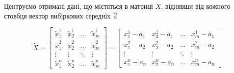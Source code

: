 Центруємо отримані дані, що містяться в матриці $X$, віднявши від кожного
стовбця вектор вибіркових середніх $\vec{a}$
\begin{comment}
\begin{equation*}
  \tilde{x}_k^i = x_k^i - a_i,\qquad k = \overline{1,m}, i = \overline{1,n}
\end{equation*}
Кожен стовбець матриці вимірювань прийме вигляд
\begin{equation*}
  \tilde{X}_k
  = \vec{X}_k - \vec{a}
  = \begin{bmatrix}
    x_k^1 - a_1 \\
    x_k^2 - a_2 \\
    \vdots      \\
    x_k^n - a_n
  \end{bmatrix},
  \qquad k = \overline{1,m}
\end{equation*}
Маємо матрицю центрованих вимірювань $\tilde{X}$
\end{comment}
\begin{equation*}
  \tilde{X}
  = \begin{bmatrix}
    \tilde{x}_1^1  & \tilde{x}_2^1  & \dots  & \tilde{x}_m^1  \\
    \tilde{x}_1^2  & \tilde{x}_2^2  & \dots  & \tilde{x}_m^2  \\
    \vdots & \vdots & \ddots & \vdots \\
    \tilde{x}_1^n  & \tilde{x}_2^n  & \dots  & \tilde{x}_m^n
  \end{bmatrix}
  = \begin{bmatrix}
    x_1^1 - a_1  & x_2^1 - a_1  & \dots  & x_m^1 - a_1 \\
    x_1^2 - a_2  & x_2^2 - a_2  & \dots  & x_m^2 - a_2 \\
    \vdots       & \vdots       & \ddots & \vdots      \\
    x_1^n - a_n  & x_2^n - a_n  & \dots  & x_m^n - a_n
  \end{bmatrix}
\end{equation*}

